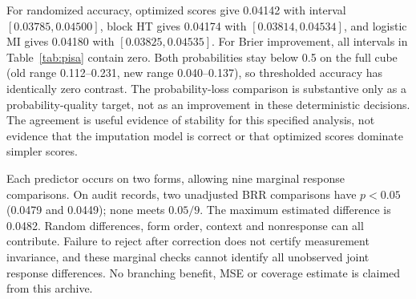 For randomized accuracy, optimized scores give 0.04142 with interval
$[0.03785,0.04500]$, block HT gives 0.04174 with
$[0.03814,0.04534]$, and logistic MI gives 0.04180 with
$[0.03825,0.04535]$. For Brier improvement, all intervals in
Table~\ref{tab:pisa} contain zero. Both probabilities stay below 0.5 on
the full cube (old range 0.112--0.231, new range 0.040--0.137), so
thresholded accuracy has identically zero contrast. The probability-loss
comparison is substantive only as a probability-quality target, not as
an improvement in these deterministic decisions. The agreement is useful evidence of
stability for this specified analysis, not evidence that the imputation
model is correct or that optimized scores dominate simpler scores.

Each predictor occurs on two forms, allowing nine marginal response
comparisons. On audit records, two unadjusted BRR comparisons have
$p<0.05$ (0.0479 and 0.0449); none meets $0.05/9$. The maximum estimated
difference is 0.0482. Random differences, form order, context and
nonresponse can all contribute. Failure to reject after correction does
not certify measurement invariance, and these marginal checks cannot
identify all unobserved joint response differences. No branching benefit,
MSE or coverage estimate is claimed from this archive.


